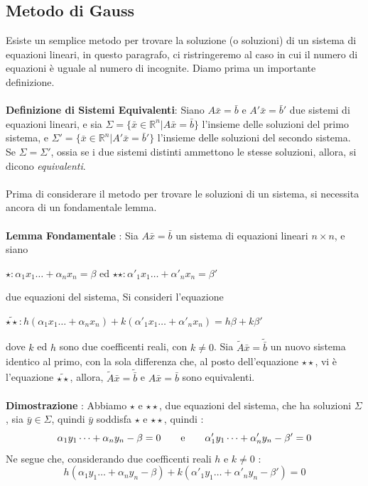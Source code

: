 \documentclass[12pt, letterpaper]{article}
\newcommand{\R}{{\mathbb R}}
\newcommand{\acc}{\\\hphantom{}\\}
\begin{document}
\subsection{Metodo di Gauss}
Esiste un semplice metodo per trovare la soluzione (o soluzioni) di un sistema di equazioni lineari, in questo 
paragrafo, ci ristringeremo al caso in cui il numero di equazioni è uguale al numero di incognite. Diamo prima un importante definizione.
\acc\textbf{Definizione di Sistemi Equivalenti}: Siano \(A\bar x = \bar b\) e \(A'\bar x = \bar b'\) due sistemi di equazioni 
lineari, e sia \(\Sigma = \{\bar x\in \R^n | A\bar x = \bar b\}\) l'insieme delle soluzioni del primo sistema, e
\(\Sigma' = \{\bar x\in \R^n | A'\bar x = \bar b'\}\) l'insieme delle soluzioni del secondo sistema. Se \(\Sigma=\Sigma'\), 
ossia se i due sistemi distinti ammettono le stesse soluzioni, allora, si dicono \textit{equivalenti}.\acc 
Prima di considerare il metodo per trovare le soluzioni di un sistema, si necessita ancora di un fondamentale lemma.\acc 
\textbf{Lemma Fondamentale} : Sia \(A\bar x = \bar b\) un sistema di equazioni lineari \(n\times n\), e siano\begin{center} 
\(\star : \alpha_1x_1\dots+\alpha_nx_n=\beta\) \hphantom{aa}ed\hphantom{aa} \(\star\star : \alpha'_1x_1\dots+\alpha'_nx_n=\beta'\)\end{center} due equazioni 
del sistema, Si consideri l'equazione\begin{center}  \(\tilde{\star\star} : h(\alpha_1x_1\dots+\alpha_nx_n)
+k(\alpha'_1x_1\dots+\alpha'_nx_n)=h\beta+k\beta'\)\end{center} dove \(k\) ed \(h\) sono due 
coefficenti reali, con \(k\ne 0\). Sia \(\tilde A\bar x = \tilde{\bar b}\) un nuovo sistema identico al primo, con la sola 
differenza che, al posto dell'equazione \(\star\star\), vi è l'equazione \(\tilde{\star\star}\), allora, 
\(\tilde A\bar x = \tilde{\bar b}\) e \(A\bar x = \bar b\) sono equivalenti. \acc
\textbf{Dimostrazione }: Abbiamo \(\star\) e \(\star\star\), due equazioni del sistema, che ha 
soluzioni \(\Sigma\), sia \(\bar y\in\Sigma\), quindi \(\bar y\) soddisfa \(\star\) e \(\star\star\), quindi : 
\begin{equation}
    \alpha_1y_1\dots+\alpha_ny_n-\beta = 0 \text{\hphantom{aaaa}e\hphantom{aaaa}} \alpha'_1y_1\dots+\alpha'_ny_n-\beta' = 0
\end{equation}
Ne segue che, considerando due coefficenti reali \(h\) e \(k\ne 0\) :\begin{equation}
    h(\alpha_1y_1\dots+\alpha_ny_n-\beta)+k(\alpha'_1y_1\dots+\alpha'_ny_n-\beta')=0
\end{equation}
\end{document}
